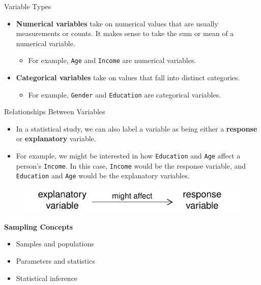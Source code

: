\documentclass[10pt]{beamer}
\begin{document}
\begin{frame}{Variable Types}
\vspace{-2.5cm}
\begin{itemize}
\item \textbf{Numerical variables} take on numerical values that are usually measurements or counts.  It makes sense to take the sum or mean of a numerical variable.  
\begin{itemize}
\item For example, \texttt{Age} and \texttt{Income} are numerical variables.
\end{itemize}
\vspace{10pt}  
\item \textbf{Categorical variables} take on values that fall into distinct categories.  
\begin{itemize}
\item For example, \texttt{Gender} and \texttt{Education} are categorical variables.
\end{itemize}
\end{itemize}
\end{frame}

\begin{frame}{Relationships Between Variables}
\begin{itemize}
\item In a statistical study, we can also label a variable as being either a \textbf{response} or \textbf{explanatory} variable.
\vspace{10pt} 
\item For example, we might be interested in how \texttt{Education} and \texttt{Age} affect a person's \texttt{Income}.  In this case, \texttt{Income} would be the response variable, and \texttt{Education} and \texttt{Age} would be the explanatory variables.
\vspace{5pt}
\end{itemize} 
\begin{figure}
\includegraphics[scale=0.75]{figure/variables.pdf}
\end{figure}
\end{frame}

\begin{frame}
\large \textbf{Sampling Concepts}
\begin{itemize}
\item Samples and populations
\item Parameters and statistics
\item Statistical inference
\end{itemize}
\end{frame}
\end{document}
